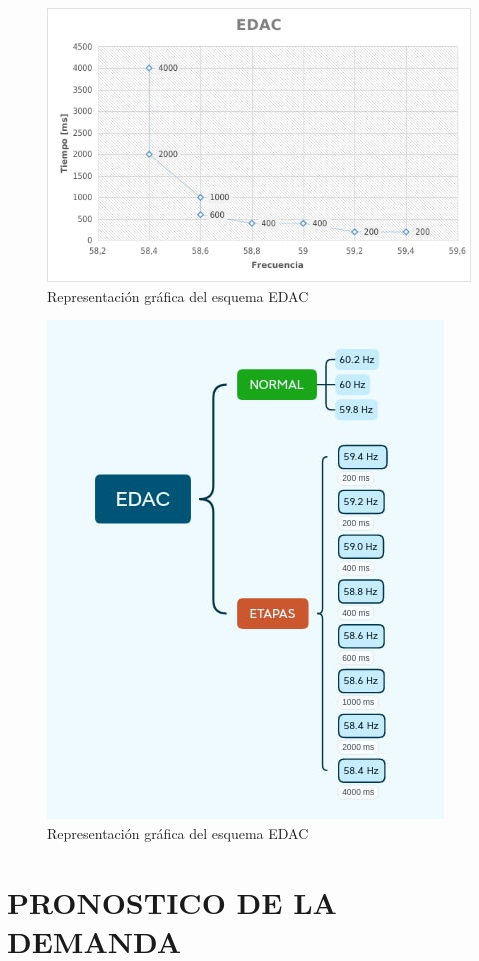 \documentclass[a5paper]{book}%
\begin{document}
\begin{figure}[H]
  \centering
  \caption{Representación gráfica del esquema EDAC}
  \label{fig:edac1}
  \includegraphics[width=0.8\linewidth]{EDAC1}
\end{figure}

\begin{figure}[H]
  \centering
  \caption{Representación gráfica del esquema EDAC}
  \label{fig:edac2}
  \includegraphics[width=0.8\linewidth]{EDAC}
\end{figure}

\chapter{PRONOSTICO DE LA DEMANDA}
\end{document}
